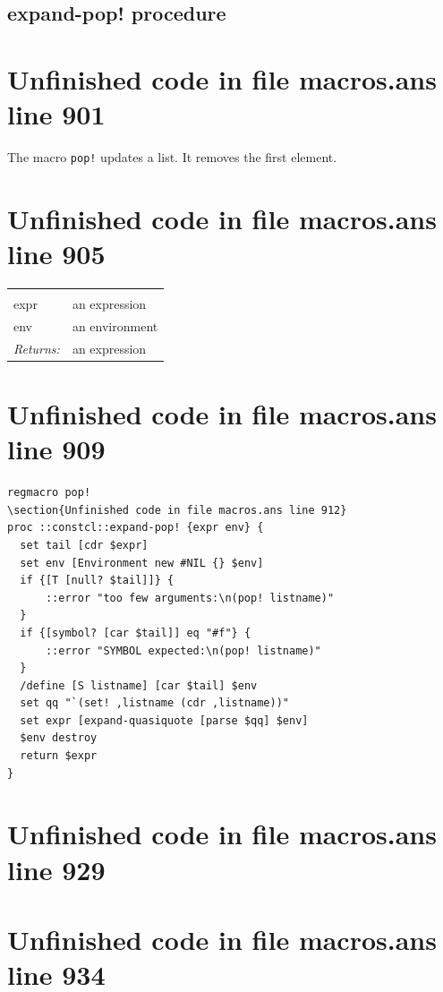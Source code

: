 \documentclass[twoside,9pt]{report}
\begin{document}
\subsection{expand-pop! procedure}
\label{expand-pop"!-procedure}
\section{Unfinished code in file macros.ans line 901}


The macro \texttt{pop!} updates a list. It removes the first element.

\section{Unfinished code in file macros.ans line 905}
\noindent\begin{tabular}{ |p{1.9cm} p{8cm}| }
\hline
\rowcolor[HTML]{CCCCCC} \multicolumn{2}{|l|}{\bf expand-pop! (internal)} \\
expr & an expression \\
env & an environment \\
\textit{Returns:} & an expression \\
\hline
\end{tabular}
\section{Unfinished code in file macros.ans line 909}
\begin{lstlisting}
regmacro pop!
\section{Unfinished code in file macros.ans line 912}
proc ::constcl::expand-pop! {expr env} {
  set tail [cdr $expr]
  set env [Environment new #NIL {} $env]
  if {[T [null? $tail]]} {
      ::error "too few arguments:\n(pop! listname)"
  }
  if {[symbol? [car $tail]] eq "#f"} {
      ::error "SYMBOL expected:\n(pop! listname)"
  }
  /define [S listname] [car $tail] $env
  set qq "`(set! ,listname (cdr ,listname))"
  set expr [expand-quasiquote [parse $qq] $env]
  $env destroy
  return $expr
}
\end{lstlisting}
\section{Unfinished code in file macros.ans line 929}
\section{Unfinished code in file macros.ans line 934}
\end{document}
